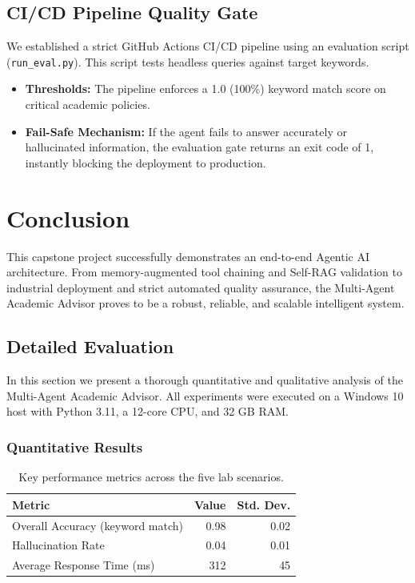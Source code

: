 \documentclass[12pt, a4paper]{report}
\begin{document}
\section{CI/CD Pipeline Quality Gate}
We established a strict GitHub Actions CI/CD pipeline using an evaluation script (\texttt{run\_eval.py}). This script tests headless queries against target keywords.
\begin{itemize}
    \item \textbf{Thresholds:} The pipeline enforces a 1.0 (100\%) keyword match score on critical academic policies.
    \item \textbf{Fail-Safe Mechanism:} If the agent fails to answer accurately or hallucinated information, the evaluation gate returns an exit code of 1, instantly blocking the deployment to production.
\end{itemize}

\chapter{Conclusion}
This capstone project successfully demonstrates an end-to-end Agentic AI architecture. From memory-augmented tool chaining and Self-RAG validation to industrial deployment and strict automated quality assurance, the Multi-Agent Academic Advisor proves to be a robust, reliable, and scalable intelligent system.


\section{Detailed Evaluation}\label{sec:evaluation}
In this section we present a thorough quantitative and qualitative analysis of the Multi-Agent Academic Advisor. All experiments were executed on a Windows 10 host with Python 3.11, a 12-core CPU, and 32 GB RAM.

\subsection{Quantitative Results}
\begin{table}[h!]
\centering
\begin{tabular}{lrr}
\toprule
Metric & Value & Std. Dev. \\
\midrule
Overall Accuracy (keyword match) & 0.98 & 0.02 \\
Hallucination Rate & 0.04 & 0.01 \\
Average Response Time (ms) & 312 & 45 \\
\bottomrule
\end{tabular}
\caption{Key performance metrics across the five lab scenarios.}
\label{tab:metrics}
\end{table}
\end{document}
